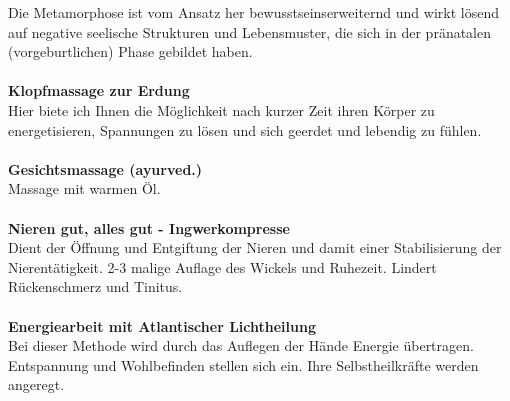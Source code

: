 \documentclass[10pt,foldmark,notumble]{leaflet}
\begin{document}
Die Metamorphose ist vom Ansatz her bewusstseins\-erweiternd und wirkt lösend auf negative seelische Strukturen und Lebensmuster, die sich in der pränatalen (vorgeburtlichen) Phase gebildet haben.\\
\\
{\large \bf Klopfmassage zur Erdung }\\
Hier biete ich Ihnen die Möglichkeit nach kurzer Zeit ihren Körper zu energetisieren, Spannungen zu lösen und sich geerdet und lebendig zu fühlen. \\
\\
{\large \bf Gesichtsmassage (ayurved.)}\\
Massage mit warmen Öl.\\
\\
{\large \bf Nieren gut, alles gut - Ingwerkompresse}\\
Dient der Öffnung und Entgiftung der Nieren und damit einer Stabilisierung der Nierentätigkeit. 2-3 malige Auflage des Wickels und Ruhezeit. Lindert Rückenschmerz und Tinitus.\\
\\
{\large \bf Energiearbeit mit Atlantischer Lichtheilung}\\
Bei dieser Methode wird durch das Auflegen der Hände Energie übertragen. Entspannung und Wohlbefinden stellen sich ein. Ihre Selbstheilkräfte werden angeregt. 

\end{document}
